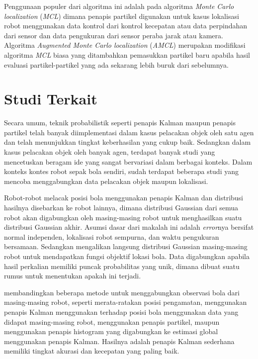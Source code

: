 Penggunaan populer dari algoritma ini adalah pada algoritma \textit{Monte Carlo localization} (\textit{MCL}) dimana penapis partikel digunakan untuk kasus lokalisasi robot menggunakan data kontrol dari kontrol kecepatan atau data perpindahan dari sensor dan data pengukuran dari sensor peraba jarak atau kamera. Algoritma \textit{Augmented Monte Carlo localization} (\textit{AMCL}) merupakan modifikasi algoritma \textit{MCL} biasa yang ditambahkan pemasukkan partikel baru apabila hasil evaluasi partikel-partikel yang ada sekarang lebih buruk dari sebelumnya.

\section{Studi Terkait}

Secara umum, teknik probabilistik seperti penapis Kalman maupun penapis partikel telah banyak diimplementasi dalam kasus pelacakan objek oleh satu agen dan telah menunjukkan tingkat keberhasilan yang cukup baik. Sedangkan dalam kasus pelacakan objek oleh banyak agen, terdapat banyak studi yang mencetuskan beragam ide yang sangat bervariasi dalam berbagai konteks. Dalam konteks kontes robot sepak bola sendiri, sudah terdapat beberapa studi yang mencoba menggabungkan data pelacakan objek maupun lokalisasi.

Robot-robot \citet{stroupe2001} melacak posisi bola menggunakan penapis Kalman dan distribusi hasilnya disebarkan ke robot lainnya, dimana distribusi Gaussian dari semua robot akan digabungkan oleh masing-masing robot untuk menghasilkan suatu distribusi Gaussian akhir. Asumsi dasar dari makalah ini adalah \textit{error}nya bersifat normal independen, lokalisasi robot sempurna, dan waktu pengukuran bersamaan. Sedangkan \citet{pinheiro2004} mengalikan langsung distribusi Gaussian masing-masing robot untuk mendapatkan fungsi objektif lokasi bola. Data digabungkan apabila hasil perkalian memiliki puncak probabilitas yang unik, dimana dibuat suatu rumus untuk menentukan apakah ini terjadi.

\citet{ferrein2005} membandingkan beberapa metode untuk menggabungkan observasi bola dari masing-masing robot, seperti merata-ratakan posisi pengamatan, menggunakan penapis Kalman menggunakan terhadap posisi bola menggunakan data yang didapat masing-masing robot, menggunakan penapis partikel, maupun menggunakan penapis histogram yang digabungkan ke estimasi global menggunakan penapis Kalman. Hasilnya adalah penapis Kalman sederhana memiliki tingkat akurasi dan kecepatan yang paling baik.

